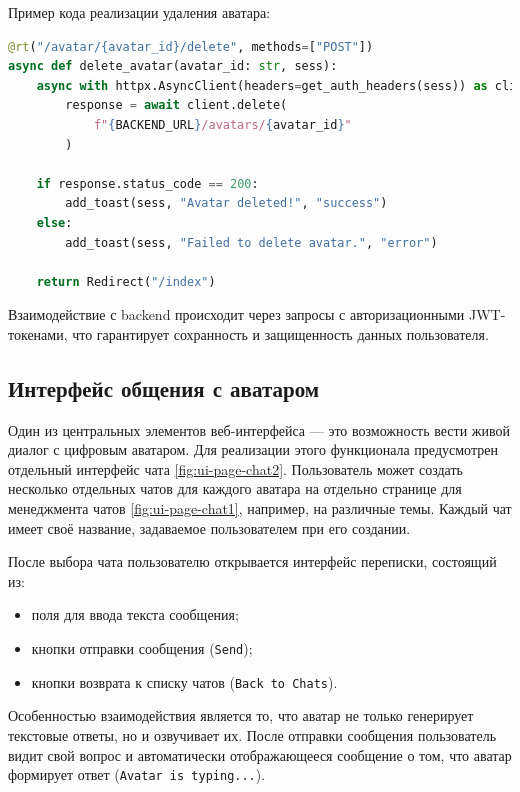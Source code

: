 Пример кода реализации удаления аватара:

\begin{lstlisting}[language=Python, numbers=none, frame=none]
@rt("/avatar/{avatar_id}/delete", methods=["POST"])
async def delete_avatar(avatar_id: str, sess):
    async with httpx.AsyncClient(headers=get_auth_headers(sess)) as client:
        response = await client.delete(
            f"{BACKEND_URL}/avatars/{avatar_id}"
        )

    if response.status_code == 200:
        add_toast(sess, "Avatar deleted!", "success")
    else:
        add_toast(sess, "Failed to delete avatar.", "error")

    return Redirect("/index")
\end{lstlisting}


Взаимодействие с backend происходит через запросы с авторизационными JWT-токенами, что гарантирует 
сохранность и защищенность данных пользователя.

\subsection{Интерфейс общения с аватаром}

Один из центральных элементов веб-интерфейса — это возможность вести живой диалог с 
цифровым аватаром. Для реализации этого функционала предусмотрен отдельный интерфейс чата \ref{fig:ui-page-chat2}. 
Пользователь может создать несколько отдельных чатов для каждого аватара на отдельно странице для 
менеджмента чатов \ref{fig:ui-page-chat1}, например, на различные 
темы. Каждый чат имеет своё название, задаваемое пользователем при его создании.


После выбора чата пользователю открывается интерфейс переписки, состоящий из:

\begin{itemize}
  \item поля для ввода текста сообщения;
  \item кнопки отправки сообщения (\texttt{Send});
  \item кнопки возврата к списку чатов (\texttt{Back to Chats}).
\end{itemize}


Особенностью взаимодействия является то, что аватар не только генерирует текстовые ответы, но и 
озвучивает их. После отправки сообщения пользователь видит свой вопрос и автоматически 
отображающееся сообщение о том, что аватар формирует ответ (\texttt{Avatar is typing...}).


